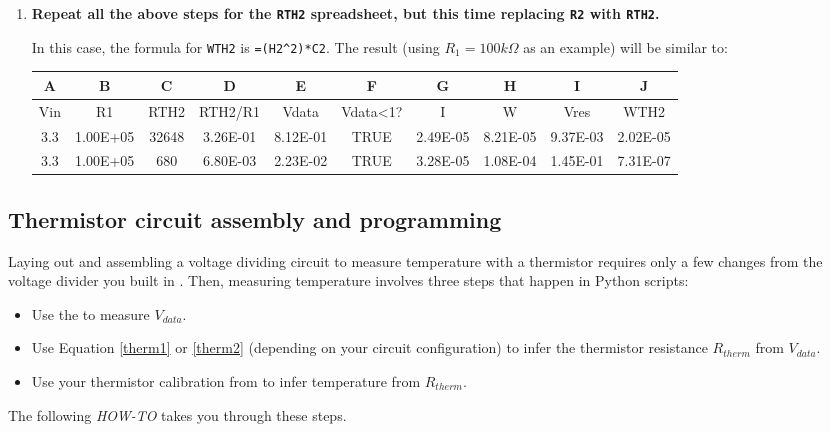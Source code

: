 \begin{enumerate}
	\item \textbf{Repeat all the above steps for the \texttt{RTH2} spreadsheet, but this time replacing \texttt{R2} with \texttt{RTH2}.}
	
	In this case, the formula for \texttt{WTH2} is \lstinline{=(H2^2)*C2}.
	The result (using $R_1=100k\Omega$ as an example) will be similar to:
\begin{table}[H]
	\centering
	\begin{small}
		\begin{tabular}{|c|c|c|c|c|c|c|c|c|c|}
			\hline 
			\textbf{A}  & \textbf{B} & \textbf{C} & \textbf{D} & \textbf{E} & \textbf{F} & \textbf{G} & \textbf{H} & \textbf{I} & \textbf{J} \\ 
			\hline 
			Vin  & R1 & RTH2 & RTH2/R1 & Vdata & Vdata<1? & I & W & Vres & WTH2\\ 
			\hline 
			3.3 & 1.00E+05  & 32648 & 3.26E-01 & 8.12E-01 & TRUE & 2.49E-05 & 8.21E-05 & 9.37E-03 & 2.02E-05\\ 
			\hline 
			3.3 & 1.00E+05  & 680 & 6.80E-03 & 2.23E-02 & TRUE & 3.28E-05 & 1.08E-04 & 1.45E-01 & 7.31E-07\\ 
			\hline 
		\end{tabular} 
	\end{small}
\end{table}	
	
\end{enumerate}


\subsection{Thermistor circuit assembly and programming}
Laying out and assembling a voltage dividing circuit to measure temperature with a thermistor requires only a few changes from the voltage divider you built in .
Then, measuring temperature involves three steps that happen in Python scripts:   
\begin{itemize}
	\item Use the \adc to measure $V_{data}$.
	\item Use Equation \ref{therm1} or \ref{therm2} (depending on your circuit configuration) to infer the thermistor resistance $R_{therm}$ from $V_{data}$.
	\item Use your thermistor calibration from  to infer temperature from $R_{therm}$.
\end{itemize} 
The following \textit{HOW-TO} takes you through these steps. 
 
